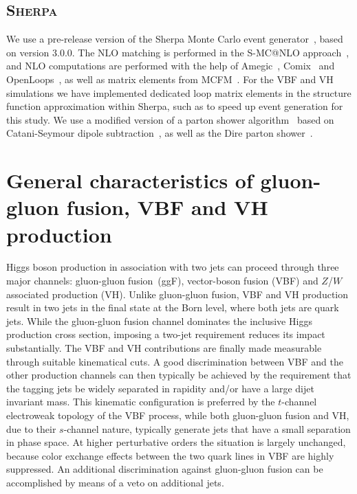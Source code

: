 \documentclass[10pt,prd,fleqn,superscriptaddress,notitlepage,nofootinbib,preprintnumbers,nobalancelastpage]{revtex4-1}
\newcommand{\Sherpa}{\textsc{Sherpa}\xspace}
\newcommand{\VBF}{VBF\xspace}
\newcommand{\VH}{VH\xspace}
\begin{document}
\subsection{\Sherpa}
We use a pre-release version of the Sherpa Monte
Carlo event generator~\cite{Gleisberg:2003xi,Gleisberg:2008ta,Bothmann:2019yzt},
based on version 3.0.0. The NLO matching is performed in the S-MC@NLO
approach~\cite{Hoeche:2011fd,Hoeche:2012ft}, and NLO computations are performed with
the help of Amegic~\cite{Krauss:2001iv,Gleisberg:2007md}, Comix~\cite{Gleisberg:2008fv}
and OpenLoops~\cite{Cascioli:2011va,Buccioni:2019sur}, as well as matrix elements from MCFM~\cite{Campbell:2019dru}.
For the \VBF and \VH simulations we have implemented dedicated loop matrix elements
in the structure function approximation within Sherpa,
such as to speed up event generation for this study.
We use a modified version of a parton shower algorithm~\cite{Schumann:2007mg}
based on Catani-Seymour dipole subtraction~\cite{Catani:1996vz,Catani:2002hc},
as well as the Dire parton shower~\cite{Hoche:2015sya}.


\section{General characteristics of gluon-gluon fusion,  \VBF and \VH production}
\label{sec:characteristics}
Higgs boson production in association with two jets can proceed through three major channels: gluon-gluon fusion~(ggF), vector-boson fusion (\VBF) and
$Z$/$W$ associated production (\VH). 
Unlike gluon-gluon fusion, \VBF and \VH production result in two jets in the final state at the Born level, where both jets are quark jets.
While the gluon-gluon fusion channel dominates the inclusive Higgs production cross section, imposing a two-jet requirement reduces its impact substantially.
The \VBF and \VH contributions are finally made measurable through suitable kinematical cuts.
A good discrimination between \VBF and the other production channels can then typically be achieved by the requirement that the tagging jets 
be widely separated in rapidity and/or have a large dijet invariant mass. This kinematic configuration is preferred by the $t$-channel electroweak
topology of the VBF process, while both gluon-gluon fusion and \VH, due to their $s$-channel nature, typically generate jets that have a small separation
in phase space. At higher perturbative orders the situation is largely unchanged, because color exchange effects between the two quark lines
in \VBF are highly suppressed. An additional discrimination against gluon-gluon fusion can be accomplished by means of a veto on additional jets. 
\end{document}
